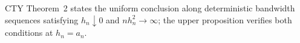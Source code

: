 CTY Theorem~2 states the uniform conclusion along deterministic bandwidth sequences satisfying \(h_n\downarrow0\) and \(nh_n^2\to\infty\); the upper proposition verifies both conditions at \(h_n=a_n\).